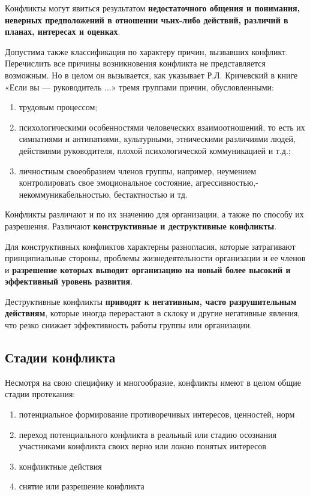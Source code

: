 \documentclass[a4paper,14pt]{extarticle}
\begin{document}
\hfill

Конфликты могут явиться результатом \textbf{недостаточного общения и понимания, неверных предположений в отношении чьих-либо действий, различий в планах, интересах и оценках}.

Допустима также классификация по характеру причин, вызвавших конфликт. Перечислить все причины возникновения конфликта не представляется возможным. Но в целом он вызывается, как указывает Р.Л. Кричевский в книге «Если вы — руководитель ...» тремя группами причин, обусловленными:

\begin{enumerate}
    \item трудовым процессом;
    \item психологическими особенностями человеческих взаимоотношений, то есть их симпатиями и антипатиями, культурными, этническими различиями людей, действиями руководителя, плохой психологической коммуникацией и т.д.;
    \item личностным своеобразием членов группы, например, неумением контролировать свое эмоциональное состояние, агрессивностью,- некоммуникабельностью, бестактностью и тд.
\end{enumerate}

Конфликты различают и по их значению для организации, а также по способу их разрешения. Различают \textbf{конструктивные и деструктивные конфликты}.

Для конструктивных конфликтов характерны разногласия, которые затрагивают принципиальные стороны, проблемы жизнедеятельности организации и ее членов и \textbf{разрешение которых выводит организацию на новый более высокий и эффективный уровень развития}.

Деструктивные конфликты \textbf{приводят к негативным, часто разрушительным действиям}, которые иногда перерастают в склоку и другие негативные явления, что резко снижает эффективность работы группы или организации.

\subsection{Стадии конфликта}

Несмотря на свою специфику и многообразие, конфликты имеют в целом общие стадии протекания:

\begin{enumerate}
    \item потенциальное формирование противоречивых интересов, ценностей, норм
    \item переход потенциального конфликта в реальный или стадию осознания участниками конфликта своих верно или ложно понятых интересов
    \item конфликтные действия
    \item снятие или разрешение конфликта
\end{enumerate}
\end{document}
